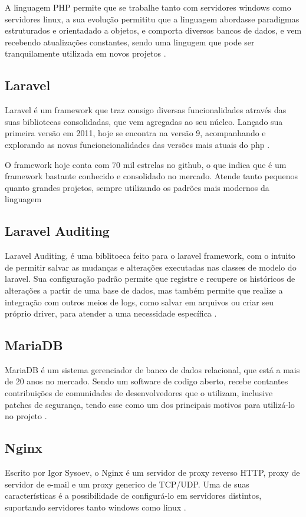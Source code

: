 A linguagem PHP permite que se trabalhe tanto com servidores windows como servidores linux, a sua evolução permititu que a linguagem abordasse paradigmas estruturados e orientadado a objetos, e comporta diversos bancos de dados, e vem recebendo atualizações constantes, sendo uma lingugem que pode ser tranquilamente utilizada em novos projetos \citep{phpdocs}.
    
\subsection{Laravel}
Laravel é um framework que traz consigo diversas funcionalidades através das suas bibliotecas consolidadas, que vem agregadas ao seu núcleo. Lançado sua primeira versão em 2011, hoje se encontra na versão 9, acompanhando e explorando as novas funcioncionalidades das versões mais atuais do php \citep{laradocs}.
    
O framework hoje conta com 70 mil estrelas no github, o que indica que é um framework bastante conhecido e consolidado no mercado. Atende tanto pequenos quanto grandes projetos, sempre utilizando os padrões mais modernos da linguagem \citep{lararepo}
        
\subsection{Laravel Auditing}
Laravel Auditing, é uma biblitoeca feito para o laravel framework, com o intuito de permitir salvar as mudanças e alterações executadas nas classes de modelo do laravel. Sua configuração padrão permite que registre e recupere os históricos de alterações a partir de uma base de dados, mas também permite que realize a integração com outros meios de logs, como salvar em arquivos ou criar seu próprio driver, para atender a uma necessidade específica \citep{auditdocs}.
    

\subsection{MariaDB}
MariaDB é um sistema gerenciador de banco de dados relacional, que está a mais de 20 anos no mercado.  Sendo um software de codigo aberto, recebe contantes contribuições de comunidades de desenvolvedores que o utilizam, inclusive patches de segurança, tendo esse como um dos principais motivos para utilizá-lo no projeto \citep{mariadbdocs}.
    
\subsection{Nginx}
Escrito por Igor Sysoev, o Nginx é um servidor de proxy reverso HTTP, proxy de servidor de e-mail e um proxy generico de TCP/UDP. Uma de suas características é a possibilidade de configurá-lo em servidores distintos, suportando servidores tanto windows como linux \citep{nginxdocs}.

